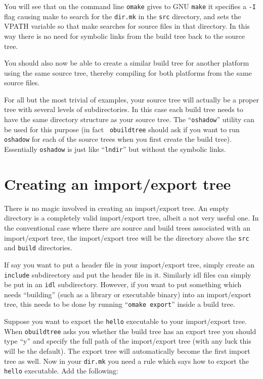 \documentclass[11pt,twoside,onecolumn]{article}
\begin{document}
You will see that on the command line {\tt omake} gives to GNU {\tt make} it
specifies a {\tt -I} flag causing make to search for the {\tt dir.mk} in the
{\tt src} directory, and sets the VPATH variable so that make searches for
source files in that directory.  In this way there is no need for symbolic
links from the build tree back to the source tree.

You should also now be able to create a similar build tree for another platform
using the same source tree, thereby compiling for both platforms from the same
source files.

For all but the most trivial of examples, your source tree will actually be a
proper tree with several levels of subdirectories.  In this case each build
tree needs to have the same directory structure as your source tree.  The
``{\tt oshadow}'' utility can be used for this purpose (in fact {\tt
obuildtree} should ask if you want to run {\tt oshadow} for each of the source
trees when you first create the build tree).  Essentially {\tt oshadow} is just
like ``{\tt lndir}'' but without the symbolic links.

\section{Creating an import/export tree}

There is no magic involved in creating an import/export tree.  An empty
directory is a completely valid import/export tree, albeit a not very useful
one.  In the conventional case where there are source and build trees
associated with an import/export tree, the import/export tree will be the
directory above the {\tt src} and {\tt build} directories.

If say you want to put a header file in your import/export tree, simply create
an {\tt include} subdirectory and put the header file in it.  Similarly idl
files can simply be put in an {\tt idl} subdirectory.  However, if you want to
put something which needs ``building'' (such as a library or executable binary)
into an import/export tree, this needs to be done by running ``{\tt omake
export}'' inside a build tree.

Suppose you want to export the {\tt hello} executable to your import/export
tree.  When {\tt obuildtree} asks you whether the build tree has an export tree
you should type ``y'' and specify the full path of the import/export tree (with
any luck this will be the default).  The export tree will automatically become
the first import tree as well.  Now in your {\tt dir.mk} you need a rule which
says how to export the {\tt hello} executable.  Add the following:
\end{document}
